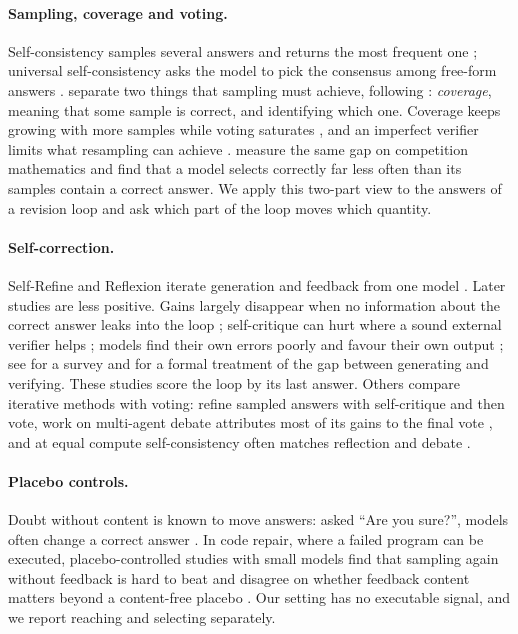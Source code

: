 \documentclass[11pt]{article}
\begin{document}
\paragraph{Sampling, coverage and voting.}
Self-consistency samples several answers and returns the most frequent one \citep{wang2023selfconsistency,aggarwal2023adaptive}; universal self-consistency asks the model to pick the consensus among free-form answers \citep{chen2023usc}.
\citet{brown2024monkeys} separate two things that sampling must achieve, following \citet{chen2021codex}: \emph{coverage}, meaning that some sample is correct, and identifying which one.
Coverage keeps growing with more samples while voting saturates \citep{chen2024morecalls}, and an imperfect verifier limits what resampling can achieve \citep{stroebl2024flaws}.
\citet{jain2026cliff} measure the same gap on competition mathematics and find that a model selects correctly far less often than its samples contain a correct answer.
We apply this two-part view to the answers of a revision loop and ask which part of the loop moves which quantity.

\paragraph{Self-correction.}
Self-Refine and Reflexion iterate generation and feedback from one model \citep{madaan2023selfrefine,shinn2023reflexion}.
Later studies are less positive.
Gains largely disappear when no information about the correct answer leaks into the loop \citep{huang2024cannot}; self-critique can hurt where a sound external verifier helps \citep{stechly2024selfverification}; models find their own errors poorly \citep{tyen2024cannot} and favour their own output \citep{xu2024pride}; see \citet{kamoi2024when} for a survey and \citet{song2024mindgap} for a formal treatment of the gap between generating and verifying.
These studies score the loop by its last answer.
Others compare iterative methods with voting: \citet{bilal2026refining} refine sampled answers with self-critique and then vote, work on multi-agent debate attributes most of its gains to the final vote \citep{smit2024mad,choi2025debate}, and at equal compute self-consistency often matches reflection and debate \citep{wang2024token}.

\paragraph{Placebo controls.}
Doubt without content is known to move answers: asked ``Are you sure?'', models often change a correct answer \citep{laban2024flipflop}.
In code repair, where a failed program can be executed, placebo-controlled studies with small models find that sampling again without feedback is hard to beat and disagree on whether feedback content matters beyond a content-free placebo \citep{iscan2026falsification,iscan2026form,verma2026blind}.
Our setting has no executable signal, and we report reaching and selecting separately.
\end{document}
